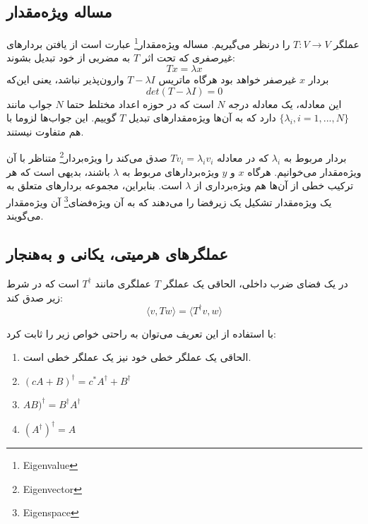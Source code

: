    \subsection{مساله ویژه‌مقدار}
   عملگر $T: V \rightarrow V$ را درنظر می‌گیریم. مساله ویژه‌مقدار\footnote{Eigenvalue} عبارت است از یافتن بردارهای غیرصفری که تحت اثر $T$ به مضربی از خود تبدیل بشوند: 
   \begin{equation}
   Tx = \lambda x
   \end{equation}
    بردار $x$ غیرصفر خواهد بود هرگاه ماتریس $T - \lambda I$ وارون‌پذیر نباشد، یعنی این‌که
    \begin{equation}
    	det(T-\lambda I) = 0
    \end{equation}
    این معادله، یک معادله درجه $N$ است که در حوزه اعداد مختلط حتما $N$ جواب مانند  $\{ \lambda_{i}, i = 1,...,N\} $ دارد که به آن‌ها ویژه‌مقدارهای تبدیل $T$ گوییم. این جواب‌ها لزوما با هم متفاوت نیستند. 
    
    بردار مربوط به $\lambda_{i}$ که در معادله $Tv_{i} = \lambda_{i} v_{i}$ صدق می‌کند را ویژه‌بردار\footnote{Eigenvector} متناظر با آن ویژه‌مقدار می‌خوانیم. هرگاه $x$ و $y$ ویژه‌بردارهای مربوط به $\lambda$ باشند، بدیهی است که هر ترکیب خطی از آن‌ها هم ویژه‌برداری از $\lambda$ است. بنابراین، مجموعه بردارهای متعلق به یک ویژه‌مقدار تشکیل یک زیرفضا را می‌دهند که به آن ویژه‌فضای\footnote{Eigenspace} آن ویژه‌مقدار می‌گویند. 
    
    \subsection{عملگرهای هرمیتی، یکانی و به‌هنجار}
    
    \begin{definition}
    در یک فضای ضرب داخلی، الحاقی یک عملگر $T$ عملگری مانند $T^{\dagger}$ است که در شرط زیر صدق کند: 
    \begin{equation}
    	\langle v,Tw \rangle = \langle T^{\dagger}v,w \rangle
    \end{equation}
    \end{definition}
    با استفاده از این تعریف می‌توان به راحتی خواص زیر را ثابت کرد:
    \begin{enumerate}
    	\item الحاقی یک عملگر خطی خود نیز یک عملگر خطی است.
    	\item $(cA + B)^{\dagger} = c^{*}A^{\dagger} + B^{\dagger}$
    	\item $AB)^{\dagger} = B^{\dagger}A^{\dagger}$
    	\item $(A^{\dagger})^{\dagger} = A$
    \end{enumerate}
     
